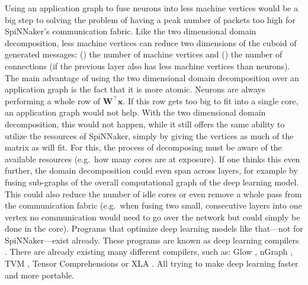 \documentclass[]{article}
\begin{document}
Using an application graph to fuse neurons into less machine vertices
would be a big step to solving the problem of having a peak number of
packets too high for SpiNNaker's communication fabric.
Like the two dimensional domain decomposition, less machine vertices
can reduce two dimensions of the cuboid of generated messages:
() the number of machine vertices and ()
the number of connections (if the previous layer also has less machine
vertices than neurons).
The main advantage of using the two dimensional domain decomposition
over an application graph is the fact that it is more atomic.
Neurons are always performing a whole row of
$\mathbf{W}^\top\mathbf{x}$.
If this row gets too big to fit into a single core, an application
graph would not help.
With the two dimensional domain decomposition, this would not happen,
while it still offers the same ability to utilize the resources of
SpiNNaker, simply by giving the vertices as much of the matrix as will
fit.
For this, the process of decomposing must be aware of the available
resources (e.g.\ how many cores are at exposure).
If one thinks this even further, the domain decomposition could even
span across layers, for example by fusing sub-graphs of the
overall computational graph of the deep learning model.
This could also reduce the number of idle cores or even remove
a whole pass from the communication fabric (e.g.\ when fusing two
small, consecutive layers into one vertex no communication would need
to go over the network but could simply be done in the core).
Programs that optimize deep learning models like that---not for
SpiNNaker---exist already.
These programs are known as deep learning compilers
\citep{li_et_al_2020}.
There are already existing many different compilers, such as:
Glow \citep{rotem_et_al_2018}, nGraph \citep{cyphers_et_al_2018},
TVM \citep{chen_et_al_2018}, Tensor Comprehensions
\citep{vasilache_et_al_2018} or XLA \citep{leary_et_al_2017}.
All trying to make deep learning faster and more portable.
\end{document}
